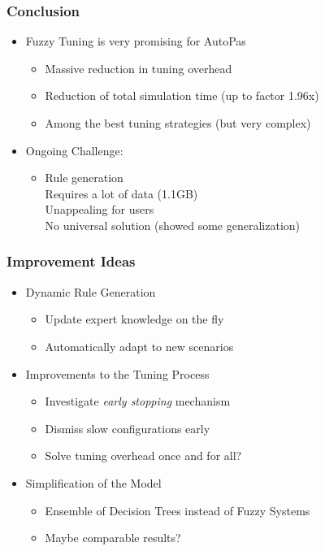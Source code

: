 \documentclass[
	10pt,
	t		%
]{beamer}
\newcommand{\xmark}{\ding{55}}%
\begin{document}
\begin{frame}
	\frametitle{Conclusion}
	\begin{itemize}
		\item Fuzzy Tuning is very promising for AutoPas
		      \begin{itemize}
			      \item Massive reduction in tuning overhead
			      \item Reduction of total simulation time (up to factor 1.96x)
			      \item Among the best tuning strategies (but very complex)
		      \end{itemize}
		      \pause
		\item Ongoing Challenge:
		      \begin{itemize}
			      \item Rule generation \\
			            \quad \xmark \; Requires a lot of data (1.1GB) \\
			            \quad \xmark \; Unappealing for users \\
			            \quad \xmark \; No universal solution (showed some generalization)
		      \end{itemize}
	\end{itemize}
\end{frame}


\begin{frame}
	\frametitle{Improvement Ideas}
	\begin{itemize}
		\item Dynamic Rule Generation
		      \begin{itemize}
			      \item Update expert knowledge on the fly
			      \item Automatically adapt to new scenarios
		      \end{itemize}
		\item Improvements to the Tuning Process
		      \begin{itemize}
			      \item Investigate \textit{early stopping} mechanism
			      \item Dismiss slow configurations early
			      \item Solve tuning overhead once and for all?
		      \end{itemize}
		\item Simplification of the Model
		      \begin{itemize}
			      \item Ensemble of Decision Trees instead of Fuzzy Systems
			      \item Maybe comparable results?
		      \end{itemize}
	\end{itemize}
\end{frame}
\end{document}
